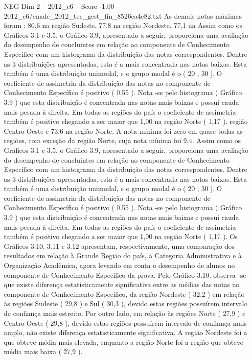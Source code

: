 \begin{textsample}{NEG Dim 2 – 2012\_c6 – Score -1.00 – 2012\_c6/enade\_2012\_tec\_gest\_fin\_8526ca4e82.txt}
As demais notas máximas foram : 80,6 na região Sudeste, 77,8 na região Nordeste, 77,1 na Assim como os Gráficos 3.1 e 3.5, o Gráfico 3.9, apresentado a seguir, proporciona uma avaliação do desempenho de concluintes em relação ao componente de Conhecimento Específico com um histograma da distribuição das notas correspondentes.
Dentre as 3 distribuições apresentadas, esta é a mais concentrada nas notas baixas.
Esta também é uma distribuição unimodal, e o grupo modal é o ( 20 ; 30 ].
O coeficiente de assimetria da distribuição das notas no componente de Conhecimento Específico é positivo ( 0,55 ).
Nota -se pelo histograma ( Gráfico 3.9 ) que esta distribuição é concentrada nas notas mais baixas e possui cauda mais pesada à direita.
Em todas as regiões do país o coeficiente de assimetria também é positivo chegando a ser maior que 1,00 na região Norte ( 1,17 ). região Centro-Oeste e 73,6 na região Norte.
A nota mínima foi zero em quase todas as regiões, com exceção da região Norte, cuja nota mínima foi 9,4.
Assim como os Gráficos 3.1 e 3.5, o Gráfico 3.9, apresentado a seguir, proporciona uma avaliação do desempenho de concluintes em relação ao componente de Conhecimento Específico com um histograma da distribuição das notas correspondentes.
Dentre as 3 distribuições apresentadas, esta é a mais concentrada nas notas baixas.
Esta também é uma distribuição unimodal, e o grupo modal é o ( 20 ; 30 ].
O coeficiente de assimetria da distribuição das notas no componente de Conhecimento Específico é positivo ( 0,55 ).
Nota -se pelo histograma ( Gráfico 3.9 ) que esta distribuição é concentrada nas notas mais baixas e possui cauda mais pesada à direita.
Em todas as regiões do país o coeficiente de assimetria também é positivo chegando a ser maior que 1,00 na região Norte ( 1,17 ).
Os Gráficos 3.10, 3.11 e 3.12 apresentam, respectivamente, uma comparação dos resultados em relação à Grande Região do país, à Categoria Administrativa e à Organização Acadêmica, agora levando em conta o desempenho de alunos no componente de Conhecimento Específico da prova.
Pelo Gráfico 3.10, observa -se que existe diferença estatisticamente significativa entre as médias das notas no componente de Conhecimento Específico, da região Nordeste ( 32,2 ) em relação às regiões Sudeste ( 29,8 ) e Sul ( 30,3 ), devido estas regiões possuírem intervalo de confiança mais estreito.
Por outro lado, em relação às regiões Norte ( 27,9 ) e Centro-Oeste ( 29,8 ), devido estas regiões possuírem intervalo de confiança mais amplo, não existe diferença estatisticamente significativa.
A região Nordeste foi a que obteve média mais elevada, enquanto a região Norte foi a região que obteve média mais baixa ( 27,9 ).

\end{textsample}
